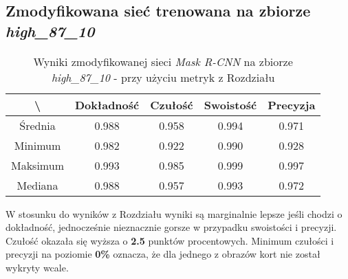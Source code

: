 \subsection{Zmodyfikowana sieć trenowana na zbiorze \textit{high\_87\_10}}
\label{sec:results_high_modified}

\begin{table}[H]
	\centering
	\caption{Wyniki zmodyfikowanej sieci \textit{Mask R-CNN} na zbiorze \textit{high\_87\_10} - przy użyciu metryk z Rozdziału }
	\vspace{6pt}
	{\footnotesize
		\begin{tabular}{|c|c|c|c|c|}
      \hline \textbackslash & Dokładność & Czułość & Swoistość & Precyzja \\
      \hline Średnia & 0.988 & 0.958 & 0.994 & 0.971 \\
      \hline Minimum & 0.982 & 0.922 & 0.990 & 0.928 \\
      \hline Maksimum & 0.993 & 0.985 & 0.999 & 0.997 \\
      \hline Mediana & 0.988 & 0.957 & 0.993 & 0.972 \\
      \hline
		\end{tabular}
	}
  \vspace{0pt}
  \label{Tab:high_modified_calculated}
\end{table}

W stosunku do wyników z Rozdziału  wyniki są marginalnie lepsze jeśli chodzi o dokładność, jednocześnie nieznacznie gorsze w przypadku swoistości i precyzji. Czułość okazała się wyższa o \textbf{2.5} punktów procentowych. Minimum czułości i precyzji na poziomie \textbf{0\%} oznacza, że dla jednego z obrazów kort nie został wykryty wcale.

